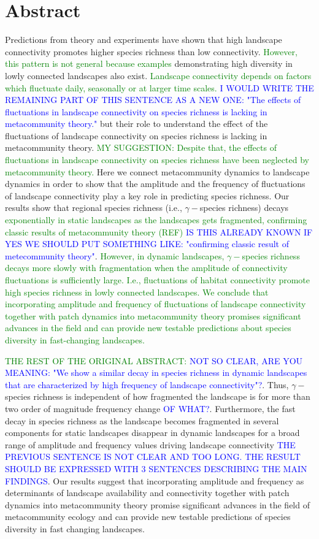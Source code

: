 \documentclass[12pt]{article}
\newcommand{\GM}[1]{\textcolor{Blue}{#1}}
\newcommand{\JK}[1]{\textcolor{Green}{#1}}
\begin{document}
\section*{Abstract}
Predictions from theory and experiments have shown that high landscape connectivity promotes higher species richness than low connectivity. \JK{However, this pattern is not general because examples} demonstrating high diversity in lowly connected landscapes also exist. \JK{Landscape connectivity depends on factors which fluctuate daily, seasonally or at larger time scales.} \GM{I WOULD WRITE THE REMAINING PART OF THIS SENTENCE AS A NEW ONE: "The effects of fluctuations in landscape connectivity on species richness is lacking in metacommunity theory."}  but their role to understand the effect of the fluctuations of landscape connectivity on species richness is lacking in metacommunity theory. \JK{MY SUGGESTION: Despite that, the effects of fluctuations in landscape connectivity on species richness have been neglected by metacommunity theory.} Here we connect metacommunity dynamics to landscape dynamics in order to show that the amplitude and the frequency of fluctuations of landscape connectivity play a key role in predicting species richness. Our results show that regional species richness (i.e., $\gamma-$species richness) decays \JK{exponentially in static landscapes as the landscapes gets fragmented, confirming classic results of metacommunity theory (REF)} \GM{IS THIS ALREADY KNOWN IF YES WE SHOULD PUT SOMETHING LIKE: "confirming  classic result of metecommunity theory"}. \JK{However, in dynamic landscapes, $\gamma-$species richness decays more slowly with fragmentation when the amplitude of connectivity fluctuations is sufficiently large. I.e., fluctuations of habitat connectivity promote high species richness in lowly connected landscapes. We conclude that incorporating amplitude and frequency of fluctuations of landscape connectivity together with patch dynamics into metacommunity theory promises significant advances in the field and can provide new testable predictions about species diversity in fast-changing landscapes.}

\JK{THE REST OF THE ORIGINAL ABSTRACT:}
\GM{NOT SO CLEAR, ARE YOU MEANING: "We show a similar decay in species richness in dynamic landscapes that are characterized by high frequency of landscape connectivity"?}. Thus, $\gamma-$species richness is independent of how fragmented the landscape is for more than two order of magnitude frequency change \GM{OF WHAT?}. Furthermore, the fast decay in species richness as the landscape becomes fragmented in several components for static landscapes disappear in dynamic landscapes for a broad range of amplitude and frequency values driving landscape connectivity \GM{THE PREVIOUS SENTENCE IS NOT CLEAR AND TOO LONG. THE RESULT SHOULD BE EXPRESSED WITH 3 SENTENCES DESCRIBING THE MAIN FINDINGS}. Our results suggest that incorporating amplitude and frequency as determinants of landscape availability and connectivity together with patch dynamics into metacommunity theory promise significant advances in the field of metacommunity ecology and can provide new testable predictions of species diversity in fast changing landscapes.
\newpage
\end{document}
